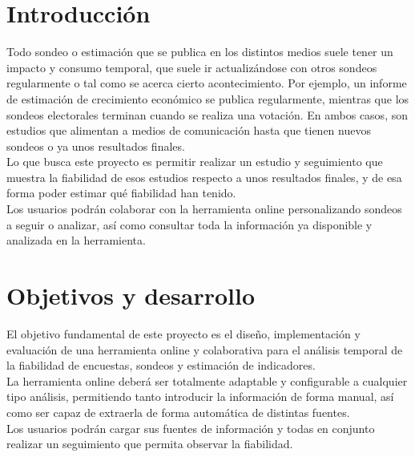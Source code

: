 
\section{Introducción}
\label{sec:introduccion}

Todo sondeo o estimación que se publica en los distintos medios suele tener un impacto y consumo temporal, que suele ir actualizándose con otros sondeos regularmente o tal como se acerca cierto acontecimiento. Por ejemplo, un informe de estimación de crecimiento económico se publica regularmente, mientras que los sondeos electorales terminan cuando se realiza una votación. En ambos casos, son estudios que alimentan a medios de comunicación hasta que tienen nuevos sondeos o ya unos resultados finales.\\
Lo que busca este proyecto es permitir realizar un estudio y seguimiento que muestra la fiabilidad de esos estudios respecto a unos resultados finales, y de esa forma poder estimar qué fiabilidad han tenido.\\
Los usuarios podrán colaborar con la herramienta online personalizando sondeos a seguir o analizar, así como consultar toda la información ya disponible y analizada en la herramienta.



\section{Objetivos y desarrollo}
\label{sec:objetivos-y-campo}

El objetivo fundamental de este proyecto es el diseño, implementación y evaluación de una herramienta online y colaborativa para el análisis temporal de la fiabilidad de encuestas, sondeos y estimación de indicadores.\\
La herramienta online deberá ser totalmente adaptable y configurable a cualquier tipo análisis, permitiendo tanto introducir la información de forma manual, así como ser capaz de extraerla de forma automática de distintas fuentes.\\
Los usuarios podrán cargar sus fuentes de información y todas en conjunto realizar un seguimiento que permita observar la fiabilidad.

